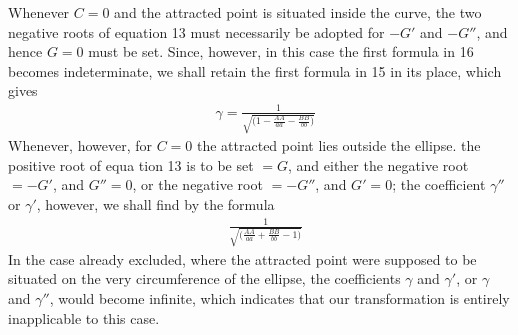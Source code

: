 Whenever $C=0$ and the attracted point is situated inside the curve, the two negative roots of equation 13 must necessarily be adopted for $-G'$ and $-G''$, and hence $G=0$ must be set. Since, however, in this case the first formula in 16 becomes indeterminate, we shall retain the first formula in 15 in its place, which gives
\[
\begin{aligned}
&\gamma=\frac{1}{\surd{\bigl(1-\frac{AA}{aa}-\frac{BB}{bb}\bigr)}}
\end{aligned}
\]
Whenever, however, for $C=0$ the attracted point lies outside the ellipse. the positive root of equa%
tion 13 is to be set $=G$, and either the negative root $=-G'$, and $G''=0$, or the negative root $=-G''$, and $G'=0$; the coefficient $\gamma''$ or $\gamma'$, however, we shall find by the formula
\[
\begin{aligned}
&\frac{1}{\surd{\bigl(\frac{AA}{aa}+\frac{BB}{bb}-1\bigr)}}
\end{aligned}
\]
In the case already excluded, where the attracted point were supposed to be situated on the very circumference of the ellipse, the coefficients $\gamma$ and $\gamma'$, or $\gamma$ and $\gamma''$, would become infinite, which indicates that our transformation is entirely inapplicable to this case.

\clearpage
\endgroup
